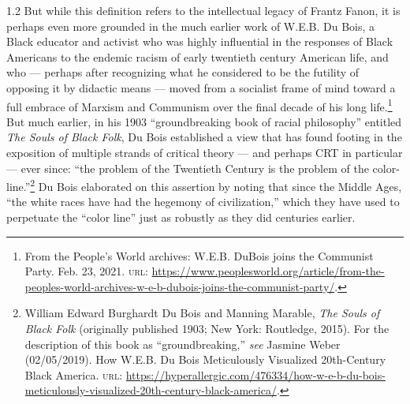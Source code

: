 \documentclass[../unravbook.tex]{subfiles}
\begin{document}
\begin{spacing}{1.2}
But while this definition refers to the intellectual legacy of Frantz Fanon, it is perhaps even more grounded in the much earlier work of W.E.B. Du Bois, a Black educator and activist who was highly influential in the responses of Black Americans to the endemic racism of early twentieth century American life, and who --- perhaps after recognizing what he considered to be the futility of opposing it by didactic means --- moved from a socialist frame of mind toward a full embrace of Marxism and Communism over the final decade of his long life.\footnote{From the People's World archives: W.E.B. DuBois joins the Communist Party. Feb. 23, 2021. \textsc{url: } \url{https://www.peoplesworld.org/article/from-the-peoples-world-archives-w-e-b-dubois-joins-the-communist-party/}.} But much earlier, in his 1903 ``groundbreaking book of racial philosophy'' entitled \textit{The Souls of Black Folk}, Du Bois established a view that has found footing in the exposition of multiple strands of critical theory --- and perhaps CRT in particular --- ever since: ``the problem of the Twentieth Century is the problem of the color-line.''\footnote{William Edward Burghardt Du Bois  and Manning Marable, \textit{The Souls of Black Folk} (originally published 1903; New York: Routledge, 2015). For the description of this book as ``groundbreaking,'' \textit{see} Jasmine Weber (02/05/2019). How W.E.B. Du Bois Meticulously Visualized 20th-Century Black America. \textsc{url:} \url{https://hyperallergic.com/476334/how-w-e-b-du-bois-meticulously-visualized-20th-century-black-america/}.} Du Bois elaborated on this assertion by noting that since the Middle Ages, ``the white races have had the hegemony of civilization,'' which they have used to perpetuate the ``color line'' just as robustly as they did centuries earlier. 


\end{spacing}
\end{document}
